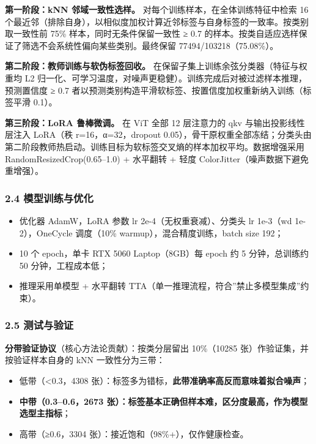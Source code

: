 \documentclass[
]{article}
\providecommand{\tightlist}{%
  \setlength{\itemsep}{0pt}\setlength{\parskip}{0pt}}
\begin{document}
\textbf{第一阶段：kNN 邻域一致性选样。}
对每个训练样本，在全体训练特征中检索 16
个最近邻（排除自身），以相似度加权计算近邻标签与自身标签的一致率。按类别取一致性前
75\% 样本，同时无条件保留一致性 ≥ 0.7
的样本。按类自适应选样保证了筛选不会系统性偏向某些类别。最终保留
77494/103218（75.08\%）。

\textbf{第二阶段：教师训练与软伪标签回收。}
在保留子集上训练余弦分类器（特征与权重均 L2
归一化、可学习温度，对噪声更稳健）。训练完成后对被过滤样本推理，预测置信度
≥ 0.7 者以预测类别构造平滑软标签、按置信度加权重新纳入训练（标签平滑
0.1）。

\textbf{第三阶段：LoRA 鲁棒微调。} 在 ViT 全部 12 层注意力的 qkv
与输出投影线性层注入 LoRA（秩 r=16，α=32，dropout
0.05），骨干原权重全部冻结；分类头由第二阶段教师热启动。训练目标为软标签交叉熵的样本加权平均。数据增强采用
RandomResizedCrop(0.65--1.0) + 水平翻转 + 轻度
ColorJitter（噪声数据下避免重增强）。

\subsubsection{2.4
模型训练与优化}\label{ux6a21ux578bux8badux7ec3ux4e0eux4f18ux5316}

\begin{itemize}
\tightlist
\item
  优化器 AdamW，LoRA 参数 lr 2e-4（无权重衰减）、分类头 lr 1e-3（wd
  1e-2），OneCycle 调度（10\% warmup），混合精度训练，batch size 192；
\item
  10 个 epoch，单卡 RTX 5060 Laptop（8GB）每 epoch 约 5 分钟，总训练约
  50 分钟，工程成本低；
\item
  推理采用单模型 + 水平翻转
  TTA（单一推理流程，符合''禁止多模型集成''约束）。
\end{itemize}

\subsubsection{2.5 测试与验证}\label{ux6d4bux8bd5ux4e0eux9a8cux8bc1}

\textbf{分带验证协议}（核心方法论贡献）：按类分层留出 10\%（10285
张）作验证集，并按验证样本自身的 kNN 一致性分为三带：

\begin{itemize}
\tightlist
\item
  低带（\textless0.3，4308
  张）：标签多为错标，\textbf{此带准确率高反而意味着拟合噪声}；
\item
  \textbf{中带（0.3--0.6，2673
  张）：标签基本正确但样本难，区分度最高，作为模型选型主指标}；
\item
  高带（≥0.6，3304 张）：接近饱和（98\%+），仅作健康检查。
\end{itemize}
\end{document}
